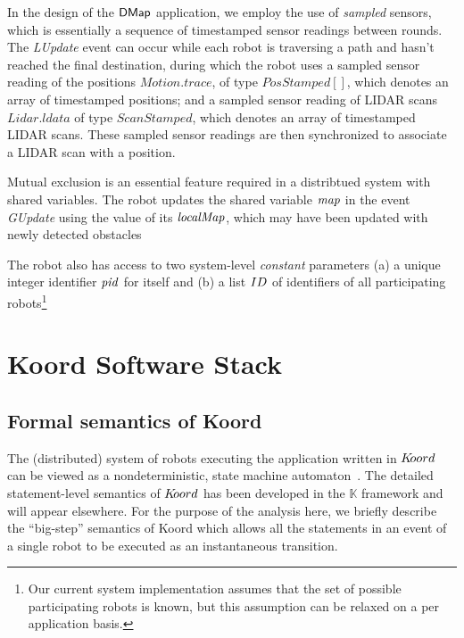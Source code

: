 In the design of the ${\sf DMap}$ application, we employ the use of \emph{sampled} sensors, which is essentially a sequence of timestamped sensor readings between rounds. The \emph{LUpdate} event can occur while each robot is traversing a path and hasn't reached the final destination, during which the robot uses a sampled sensor reading of the positions $\mathit{Motion.trace}$, of type $\mathit{PosStamped}[]$, which denotes an array of timestamped positions; and a sampled sensor reading of LIDAR scans $\mathit{Lidar.ldata}$ of type $\mathit{ScanStamped}$, which denotes an array of timestamped LIDAR scans. These sampled sensor readings are then synchronized to associate a LIDAR scan with a position.


Mutual exclusion is an essential feature required in a distribtued system with shared variables. The robot updates the shared variable $\mathit{map}$ in the event \emph{GUpdate} using the value of its $\mathit{localMap}$, which may have been updated with newly detected obstacles

The robot also has access to two system-level \emph{constant} parameters (a) a unique integer identifier $\mathit{pid}$ for itself and (b) a list $ID$ of identifiers of all participating robots\footnote{Our current system implementation assumes that the set of possible participating robots is known, but this assumption can be relaxed on a per application basis.}


\section{Koord Software Stack}
\label{sec:software}



\subsection{Formal semantics of Koord}
\label{sec:semantics}

The (distributed) system of robots  executing the \dmap application written in $K\kern-2pt oord$ can be viewed as a nondeterministic, state machine automaton~\cite{TIOAmon, Mitra07PhD}. The detailed statement-level semantics of $K\kern-2pt oord$ has been developed in the $\mathbb{K}$ framework and will appear elsewhere. For the purpose of the analysis here, we briefly describe the ``big-step'' semantics of Koord which allows all the statements in an event of a single robot to be executed as an instantaneous transition.

